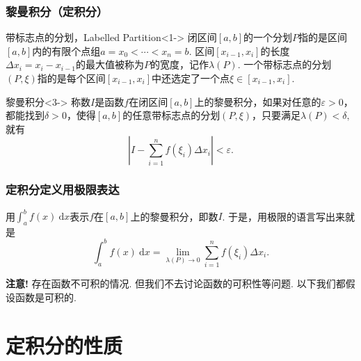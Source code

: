 \begin{frame}
\frametitle{黎曼积分（定积分）}

\begin{block}{带标志点的分划，Labelled Partition}<1->
闭区间$[a,b]$的一个分划$P$指的是区间$[a,b]$内的有限个点组$a=x_0<\cdots<x_n=b.$ 区间$[x_{i-1},x_i]$的长度$\Delta x_i = x_i-x_{i-1}$的最大值被称为$P$的宽度，记作$\lambda(P)$. \newline\pause
一个带标志点的分划$(P,\xi)$指的是每个区间$[x_{i-1},x_i]$中还选定了一个点$\xi\in[x_{i-1},x_i].$
\end{block}

\begin{block}{黎曼积分}<3->
称数$I$是函数$f$在闭区间$[a,b]$上的黎曼积分，如果对任意的$\varepsilon > 0$，都能找到$\delta > 0$，使得$[a,b]$的任意带标志点的分划$(P,\xi)$，只要满足$\lambda(P) < \delta,$ 就有
\[\left| I - \sum\limits_{i=1}^n f(\xi_i)\Delta x_i \right| < \varepsilon.\]
\end{block}

\end{frame}


\begin{frame}
\frametitle{定积分定义用极限表达}

用$\int_a^b f(x) ~ \mathrm{d} x$表示$f$在$[a,b]$上的黎曼积分，即数$I$. 于是，用极限的语言写出来就是
\[\int_a^b f(x) ~ \mathrm{d} x = \lim\limits_{\lambda(P) \to 0} \sum\limits_{i=1}^n f(\xi_i)\Delta x_i.\]

\vspace{2em}
\pause

{\bfseries 注意!} 存在函数不可积的情况. 但我们不去讨论函数的可积性等问题. 以下我们都假设函数是可积的.

\end{frame}


\section{定积分的性质}


